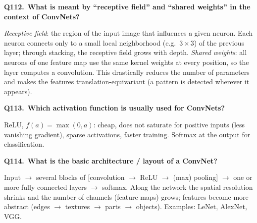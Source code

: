 \documentclass[11pt,a4paper]{article}
\newcommand{\keep}[1]{\par
  \ifdim\dimexpr\pagegoal-\pagetotal\relax<#1\relax\newpage\fi}
\newcommand{\q}[2]{\keep{2.5cm}\medskip
  {\sffamily\bfseries\color{questc}Q#1.}\ {\sffamily\bfseries #2}\par}
\begin{document}
\q{112}{What is meant by ``receptive field'' and ``shared weights'' in the
context of ConvNets?}
\emph{Receptive field}: the region of the input image that influences a given
neuron. Each neuron connects only to a small local neighborhood (e.g.\
$3\times3$) of the previous layer; through stacking, the receptive field grows
with depth. \emph{Shared weights}: all neurons of one feature map use the same
kernel weights at every position, so the layer computes a convolution. This
drastically reduces the number of parameters and makes the features
translation-equivariant (a pattern is detected wherever it appears).

\q{113}{Which activation function is usually used for ConvNets?}
ReLU, $f(a) = \max(0,a)$: cheap, does not saturate for positive inputs (less
vanishing gradient), sparse activations, faster training. Softmax at the output
for classification.

\q{114}{What is the basic architecture / layout of a ConvNet?}
\begin{center}
\end{center}
\noindent
Input $\rightarrow$ several blocks of [convolution $\rightarrow$ ReLU
$\rightarrow$ (max) pooling] $\rightarrow$ one or more fully connected layers
$\rightarrow$ softmax. Along the network the spatial resolution shrinks and
the number of channels (feature maps) grows; features become more abstract
(edges $\rightarrow$ textures $\rightarrow$ parts $\rightarrow$ objects).
Examples: LeNet, AlexNet, VGG.
\end{document}
